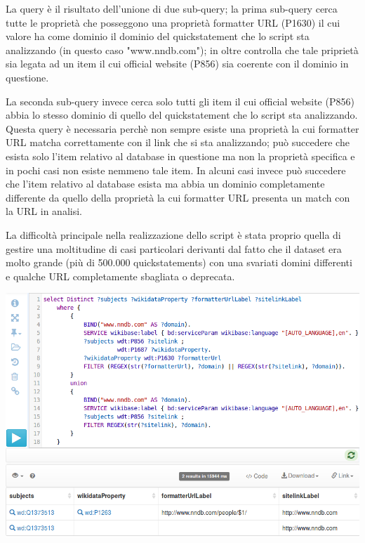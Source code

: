 La query è il risultato dell'unione di due sub-query; la prima sub-query cerca tutte le proprietà che posseggono una proprietà formatter URL (P1630) il cui valore ha come dominio il 
dominio del quickstatement che lo script sta analizzando (in questo caso "www.nndb.com"); in oltre controlla che tale priprietà sia legata ad un item il cui official website (P856) 
sia coerente con il dominio in questione. 

La seconda sub-query invece cerca solo tutti gli item il cui official website (P856) abbia lo stesso dominio di quello del quickstatement che lo script sta analizzando. 
Questa query è necessaria perchè non sempre esiste una proprietà la cui formatter URL matcha correttamente con il link che si sta analizzando; può succedere che esista solo l'item 
relativo al database in questione ma non la proprietà specifica e in pochi casi non esiste nemmeno tale item. In alcuni casi invece può succedere che l'item relativo al database 
esista ma abbia un dominio completamente differente da quello della proprietà la cui formatter URL presenta un match con la URL in analisi. 

La difficoltà principale nella realizzazione dello script è stata proprio quella di gestire una moltitudine di casi particolari derivanti dal fatto che il dataset era molto grande
(più di 500.000 quickstatements) con una svariati domini differenti e qualche URL completamente sbagliata o deprecata. 

\begin{center}
    \includegraphics[width=\linewidth]{Sources/Img/c04_01.png}
\end{center}

